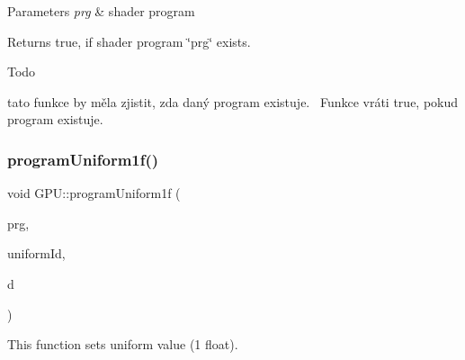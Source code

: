 \begin{DoxyParams}{Parameters}
{\em prg} & shader program\\
\hline
\end{DoxyParams}
\begin{DoxyReturn}{Returns}
true, if shader program \char`\"{}prg\char`\"{} exists. 
\end{DoxyReturn}
\begin{DoxyRefDesc}{Todo}
\item[\hyperlink{todo__todo000022}{Todo}]tato funkce by měla zjistit, zda daný program existuje.~\newline
 Funkce vráti true, pokud program existuje.~\newline
 \end{DoxyRefDesc}
\mbox{\label{group__program__tasks_gaa9e9717db5520e6c34a1b380d6321758}} 
\subsubsection{\texorpdfstring{program\+Uniform1f()}{programUniform1f()}}
{\footnotesize\ttfamily void G\+P\+U\+::program\+Uniform1f (\begin{DoxyParamCaption}\item[{\hyperlink{fwd_8hpp_a46ffd067c21ab50f5f1fcfed5d8bfc15}{Program\+ID}}]{prg,  }\item[{uint32\+\_\+t}]{uniform\+Id,  }\item[{float const \&}]{d }\end{DoxyParamCaption})}



This function sets uniform value (1 float). 


